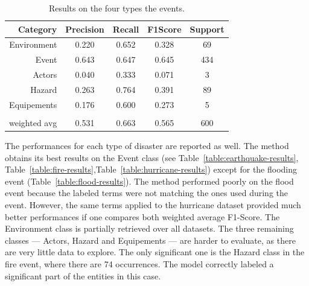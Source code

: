 \begin{table}[bht]
    \centering
    \caption{Results on the four types the events.}
    \begin{tabular}{rcccc}
        Category     & Precision & Recall & F1\-Score & Support \\
        \toprule
        Environment  & 0.220     & 0.652  & 0.328     & 69      \\
        Event        & 0.643     & 0.647  & 0.645     & 434     \\
        Actors       & 0.040     & 0.333  & 0.071     & 3       \\
        Hazard       & 0.263     & 0.764  & 0.391     & 89      \\
        Equipements  & 0.176     & 0.600  & 0.273     & 5       \\
                     &           &        &           &         \\
        weighted avg & 0.531     & 0.663  & 0.565     & 600     \\
        \bottomrule
    \end{tabular}
    \label{table:overall-results}
\end{table}

The performances for each type of disaster are reported as well.
The method obtains its best results on the Event class (see Table~\ref{table:earthquake-results}, Table~\ref{table:fire-results},Table~\ref{table:hurricane-results}) except for the flooding event (Table~\ref{table:flood-results}).
The method performed poorly on the flood event because the labeled terms were not matching the ones used during the event.
However, the same terms applied to the hurricane dataset provided much better performances if one compares both weighted average F1-Score.
The Environment class is partially retrieved over all datasets.
The three remaining classes — Actors, Hazard and Equipements — are harder to evaluate, as there are very little data to explore.
The only significant one is the Hazard class in the fire event, where there are 74 occurrences.
The model correctly labeled a significant part of the entities in this case.

